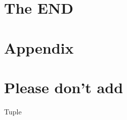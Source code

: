 \documentclass[aspectratio=169,notes]{beamer}
\begin{document}
	\section{The END}

	\section{Appendix}

	\section{Please don't add}

	\begin{frame}[fragile]{Tuple}
		\begin{columns}[T]
		\begin{column}{0.49\textwidth}
		
		\end{column}
		\pause
		\begin{column}{0.49\textwidth}
		
		\end{column}
		\end{columns}
	\end{frame}
\end{document}
